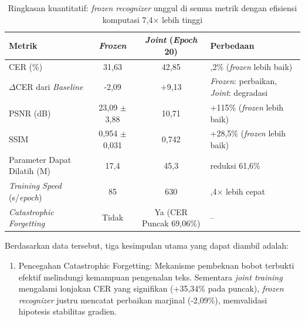 \documentclass[12pt,a4paper]{article}
\begin{document}
\begin{enumerate}[leftmargin=1.5em, labelsep=0.5em, itemindent=0pt, noitemsep, topsep=0pt, label=\arabic*., leftmargin=0.8cm]
          \begin{table}[!htbp]
              \caption[Temuan kunci frozen berbanding joint]{Ringkasan kuantitatif: \textit{frozen recognizer} unggul di semua metrik dengan efisiensi komputasi 7,4$\times$ lebih tinggi}
              \label{tab:frozen-vs-joint-summary}
              \small
              \begin{tabularx}{\textwidth}{|>{\raggedright\arraybackslash}X|c|c|>{\raggedright\arraybackslash}X|}
                  \hline
                  \textbf{Metrik}                    & \textbf{\textit{Frozen}}            & \textbf{\textit{Joint} (\textit{Epoch} 20)}      & \textbf{Perbedaan}                           \\
                  \hline
                  CER (\%)                  & 31,63             & 42,85                 & -26,2\% (\textit{frozen} lebih baik)         \\[0.3em]
                  $\Delta$CER dari \textit{Baseline} & -2,09             & +9,13                 & \textit{Frozen}: perbaikan, \textit{Joint}: degradasi \\[0.3em]
                  PSNR (dB)                 & 23,09 $\pm$ 3,88  & 10,71                 & +115\% (\textit{frozen} lebih baik)          \\[0.3em]
                  SSIM                      & 0,954 $\pm$ 0,031 & 0,742                 & +28,5\% (\textit{frozen} lebih baik)         \\[0.3em]
                  Parameter Dapat Dilatih (M)      & 17,4              & 45,3                  & reduksi 61,6\%                    \\[0.3em]
                  \textit{Training Speed} (s/\textit{epoch})  & 85                & 630                   & 7,4$\times$ lebih cepat             \\[0.3em]
                  \textit{Catastrophic Forgetting}   & Tidak             & Ya (CER Puncak 69,06\%)        & --                                 \\
                  \hline
              \end{tabularx}
          \end{table}

          Berdasarkan data tersebut, tiga kesimpulan utama yang dapat diambil adalah:
          \begin{enumerate}[leftmargin=1.5em, labelsep=0.5em, itemindent=0pt, noitemsep, topsep=0pt, label=\alph*)]
              \item Pencegahan Catastrophic Forgetting: Mekanisme pembekuan bobot terbukti efektif melindungi kemampuan pengenalan teks. Sementara \textit{joint training} mengalami lonjakan CER yang signifikan (+35,34\% pada puncak), \textit{frozen recognizer} justru mencatat perbaikan marjinal (-2,09\%), memvalidasi hipotesis stabilitas gradien.


\end{enumerate}
\end{enumerate}
\end{document}
